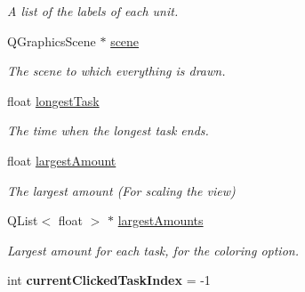 \begin{DoxyCompactItemize}
\begin{DoxyCompactList}\small\item\em A list of the labels of each unit. \end{DoxyCompactList}\item 
\hypertarget{class_main_window_a51ac2b126495216832501cea3929c6f6}{}Q\+Graphics\+Scene $\ast$ \hyperlink{class_main_window_a51ac2b126495216832501cea3929c6f6}{scene}\label{class_main_window_a51ac2b126495216832501cea3929c6f6}

\begin{DoxyCompactList}\small\item\em The scene to which everything is drawn. \end{DoxyCompactList}\item 
\hypertarget{class_main_window_a10467ff3d17d133dba6d758def5e51de}{}float \hyperlink{class_main_window_a10467ff3d17d133dba6d758def5e51de}{longest\+Task}\label{class_main_window_a10467ff3d17d133dba6d758def5e51de}

\begin{DoxyCompactList}\small\item\em The time when the longest task ends. \end{DoxyCompactList}\item 
\hypertarget{class_main_window_afaf2042d5708a2242bb7181cab07d55c}{}float \hyperlink{class_main_window_afaf2042d5708a2242bb7181cab07d55c}{largest\+Amount}\label{class_main_window_afaf2042d5708a2242bb7181cab07d55c}

\begin{DoxyCompactList}\small\item\em The largest amount (For scaling the view) \end{DoxyCompactList}\item 
\hypertarget{class_main_window_aa1b77bbae055203d9cf749c1dbb0ab40}{}Q\+List$<$ float $>$ $\ast$ \hyperlink{class_main_window_aa1b77bbae055203d9cf749c1dbb0ab40}{largest\+Amounts}\label{class_main_window_aa1b77bbae055203d9cf749c1dbb0ab40}

\begin{DoxyCompactList}\small\item\em Largest amount for each task, for the coloring option. \end{DoxyCompactList}\item 
\hypertarget{class_main_window_a218b4cd8253b62c52f813a38ac6896ab}{}int {\bfseries current\+Clicked\+Task\+Index} = -\/1\label{class_main_window_a218b4cd8253b62c52f813a38ac6896ab}


\end{DoxyCompactItemize}
